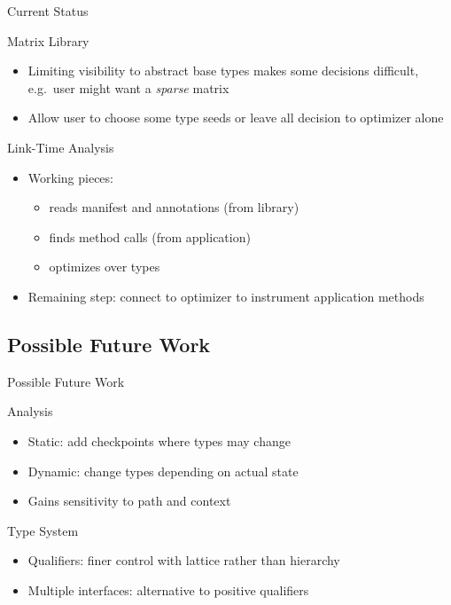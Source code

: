 \documentclass{beamer}
\begin{document}
\begin{frame}{Current Status}
  \begin{block}{Matrix Library}
    \begin{itemize}
    \item Limiting visibility to abstract base types makes some decisions difficult, e.g.\ user might want a {\it sparse} matrix
    \item Allow user to choose some type seeds or leave all decision to optimizer alone
    \end{itemize}
  \end{block}
\pause
  \begin{block}{Link-Time Analysis}
    \begin{itemize}
    \item Working pieces:
      \begin{itemize}
      \item reads manifest and annotations (from library)
      \item finds method calls (from application)
      \item optimizes over types
      \end{itemize}
    \item Remaining step: connect to optimizer to instrument application methods
    \end{itemize}
  \end{block}
\end{frame}

\subsection{Possible Future Work}

\begin{frame}{Possible Future Work}
  \begin{block}{Analysis}
    \begin{itemize}
    \item Static: add checkpoints where types may change
    \item Dynamic: change types depending on actual state
    \item Gains sensitivity to path and context
    \end{itemize}
  \end{block}
\pause
  \begin{block}{Type System}
    \begin{itemize}
    \item Qualifiers: finer control with lattice rather than hierarchy
    \item Multiple interfaces: alternative to positive qualifiers
    \end{itemize}
  \end{block}
\end{frame}
\end{document}
